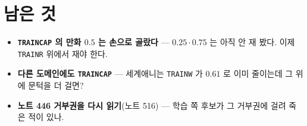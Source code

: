 \documentclass[11pt]{article}
\begin{document}
\section*{남은 것}

\begin{itemize}
\item \textbf{\texttt{TRAINCAP} 의 만화 $0.5$ 는 손으로 골랐다} --- $0.25
\cdot 0.75$ 는 아직 안 재 봤다. 이제 \texttt{TRAINR} 위에서 재야 한다.
\item \textbf{다른 도메인에도 \texttt{TRAINCAP}} --- 세계애니는
\texttt{TRAINW} 가 $0.61$ 로 이미 줄이는데 그 위에 문턱을 더 걸면?
\item \textbf{노트 446 거부권을 다시 읽기}(노트 516) --- 학습 쪽 후보가
그 거부권에 걸려 죽은 적이 있나.
\end{itemize}
\end{document}
